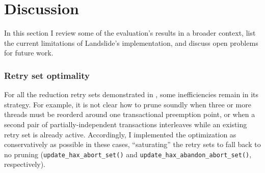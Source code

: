 



\section{Discussion}
\label{sec:tm-discussion}

In this section I review some of the evaluation's results in a broader context,
list the current limitations of Landslide's implementation,
and discuss open problems for future work.

\subsubsection{Retry set optimality}

For all the reduction retry sets demonstrated in ,
some inefficiencies remain in its strategy.
For example, it is not clear how to prune soundly
when three or more threads must be reorderd around one transactional preemption point,
or when a second pair of partially-independent transactions interleaves while an existing retry set is already active.
Accordingly, I implemented the optimization as conservatively as possible in these cases,
``saturating'' the retry sets to fall back to no pruning
({\tt update\_hax\_abort\_set()} and
{\tt update\_hax\_abandon\_abort\_set()}, respectively).

